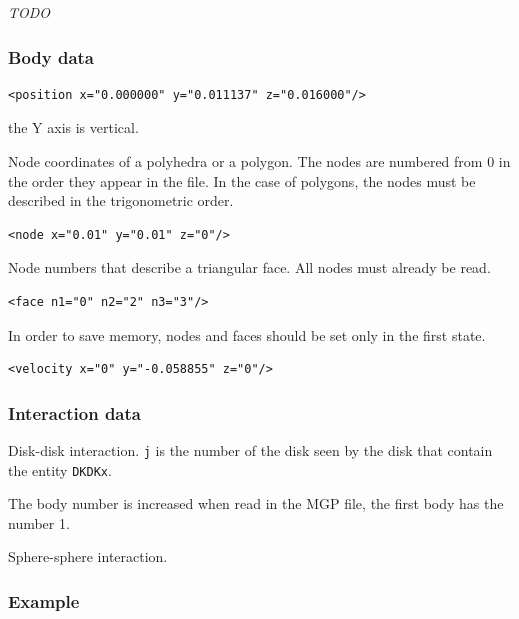 \documentclass{simpledoc}
\newcommand{\screen}[1]{\texttt{#1}}
\begin{document}
 \textit{TODO}

\subsubsection{Body data} \label{sec:marq_donnees}




\begin{lstlisting}[style=mgpdata]
  <position x="0.000000" y="0.011137" z="0.016000"/> 
\end{lstlisting}

\attention
the Y axis is vertical.

Node coordinates of a polyhedra or a polygon. The
nodes are numbered from 0 in the order they appear
in the file. In the case of polygons, the nodes must be
described in the trigonometric order.

\begin{lstlisting}[style=mgpdata]
  <node x="0.01" y="0.01" z="0"/>
\end{lstlisting}

Node numbers that describe a triangular face. All nodes must already be read.

\begin{lstlisting}[style=mgpdata]
  <face n1="0" n2="2" n3="3"/>
\end{lstlisting}

In order to save memory, nodes and faces should be set only in the first state.\\

\begin{lstlisting}[style=mgpdata]
  <velocity x="0" y="-0.058855" z="0"/>
\end{lstlisting}

\subsubsection{Interaction data}

Disk-disk interaction. 
\texttt{j} is the number of the disk seen by the disk that contain the entity \screen{DKDKx}.

\attention 
The body number is increased when read
in the MGP file, the first body has the number 1.

Sphere-sphere interaction.

\subsubsection{Example}
\end{document}
